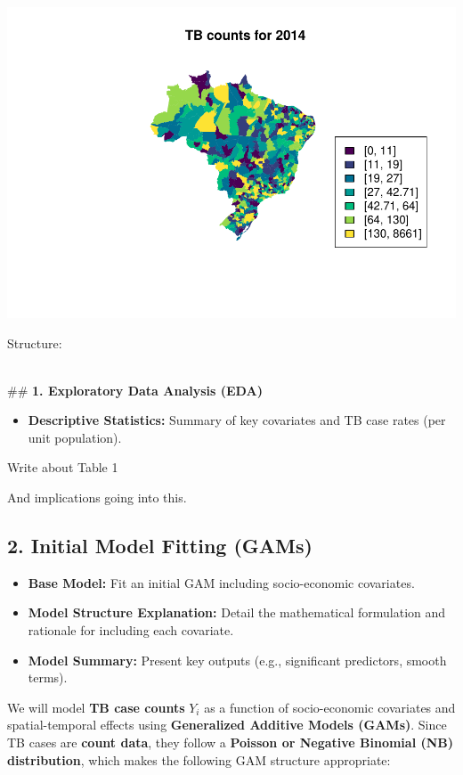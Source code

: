 \documentclass[
  11pt,
  a4paper,11pt]{article}
\providecommand{\tightlist}{%
  \setlength{\itemsep}{0pt}\setlength{\parskip}{0pt}}
\begin{document}
\includegraphics{Project_files/figure-latex/unnamed-chunk-1-1.pdf}

Structure:\\
\strut \\
\#\# \textbf{1. Exploratory Data Analysis (EDA)}

\begin{itemize}
\tightlist
\item
  \textbf{Descriptive Statistics:} Summary of key covariates and TB case
  rates (per unit population).
\end{itemize}

Write about Table 1

And implications going into this.

\subsection{\texorpdfstring{\textbf{2. Initial Model Fitting
(GAMs)}}{2. Initial Model Fitting (GAMs)}}\label{initial-model-fitting-gams}

\begin{itemize}
\item
  \textbf{Base Model:} Fit an initial GAM including socio-economic
  covariates.
\item
  \textbf{Model Structure Explanation:} Detail the mathematical
  formulation and rationale for including each covariate.
\item
  \textbf{Model Summary:} Present key outputs (e.g., significant
  predictors, smooth terms).
\end{itemize}

We will model \textbf{TB case counts} \(Y_{i}​\) as a function of
socio-economic covariates and spatial-temporal effects using
\textbf{Generalized Additive Models (GAMs)}. Since TB cases are
\textbf{count data}, they follow a \textbf{Poisson or Negative Binomial
(NB) distribution}, which makes the following GAM structure appropriate:
\end{document}
